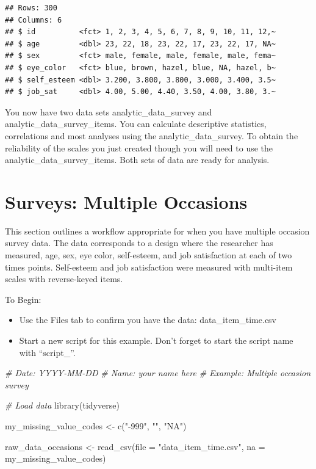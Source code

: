 \documentclass[
]{krantz}
\makeatletter
\newenvironment{Shaded}{\begin{snugshade}}{\end{snugshade}}
\newcommand{\AttributeTok}[1]{\textcolor[rgb]{0.61,0.61,0.61}{#1}}
\newcommand{\CommentTok}[1]{\textcolor[rgb]{0.37,0.37,0.37}{\textit{#1}}}
\newcommand{\FunctionTok}[1]{\textcolor[rgb]{0,0,0}{#1}}
\newcommand{\NormalTok}[1]{#1}
\newcommand{\OtherTok}[1]{\textcolor[rgb]{0.37,0.37,0.37}{#1}}
\newcommand{\StringTok}[1]{\textcolor[rgb]{0.5,0.5,0.5}{#1}}
\newenvironment{kframe}{%
\medskip{}
\setlength{\fboxsep}{.8em}
 \def\at@end@of@kframe{}%
 \ifinner\ifhmode%
  \def\at@end@of@kframe{\end{minipage}}%
  \begin{minipage}{\columnwidth}%
 \fi\fi%
 \def\FrameCommand##1{\hskip\@totalleftmargin \hskip-\fboxsep
 \colorbox{shadecolor}{##1}\hskip-\fboxsep
     \hskip-\linewidth \hskip-\@totalleftmargin \hskip\columnwidth}%
 \MakeFramed {\advance\hsize-\width
   \@totalleftmargin\z@ \linewidth\hsize
   \@setminipage}}%
 {\par\unskip\endMakeFramed%
 \at@end@of@kframe}
\renewenvironment{Shaded}{\begin{kframe}}{\end{kframe}}
\makeatother
\begin{document}
\begin{verbatim}
## Rows: 300
## Columns: 6
## $ id          <fct> 1, 2, 3, 4, 5, 6, 7, 8, 9, 10, 11, 12,~
## $ age         <dbl> 23, 22, 18, 23, 22, 17, 23, 22, 17, NA~
## $ sex         <fct> male, female, male, female, male, fema~
## $ eye_color   <fct> blue, brown, hazel, blue, NA, hazel, b~
## $ self_esteem <dbl> 3.200, 3.800, 3.800, 3.000, 3.400, 3.5~
## $ job_sat     <dbl> 4.00, 5.00, 4.40, 3.50, 4.00, 3.80, 3.~
\end{verbatim}

You now have two data sets analytic\_data\_survey and analytic\_data\_survey\_items. You can calculate descriptive statistics, correlations and most analyses using the analytic\_data\_survey. To obtain the reliability of the scales you just created though you will need to use the analytic\_data\_survey\_items. Both sets of data are ready for analysis.

\hypertarget{surveys-multiple-occasions}{%
\section{Surveys: Multiple Occasions}\label{surveys-multiple-occasions}}

This section outlines a workflow appropriate for when you have multiple occasion survey data. The data corresponds to a design where the researcher has measured, age, sex, eye color, self-esteem, and job satisfaction at each of two times points. Self-esteem and job satisfaction were measured with multi-item scales with reverse-keyed items.

To Begin:

\begin{itemize}
\item
  Use the Files tab to confirm you have the data: data\_item\_time.csv
\item
  Start a new script for this example. Don't forget to start the script name with ``script\_''.
\end{itemize}

\begin{Shaded}
\begin{Highlighting}[]
\CommentTok{\# Date: YYYY{-}MM{-}DD}
\CommentTok{\# Name: your name here}
\CommentTok{\# Example: Multiple occasion survey}

\CommentTok{\# Load data}
\FunctionTok{library}\NormalTok{(tidyverse)}

\NormalTok{my\_missing\_value\_codes }\OtherTok{\textless{}{-}} \FunctionTok{c}\NormalTok{(}\StringTok{"{-}999"}\NormalTok{, }\StringTok{""}\NormalTok{, }\StringTok{"NA"}\NormalTok{)}

\NormalTok{raw\_data\_occasions }\OtherTok{\textless{}{-}} \FunctionTok{read\_csv}\NormalTok{(}\AttributeTok{file =} \StringTok{"data\_item\_time.csv"}\NormalTok{,}
                               \AttributeTok{na =}\NormalTok{ my\_missing\_value\_codes)}
\end{Highlighting}
\end{Shaded}
\end{document}
